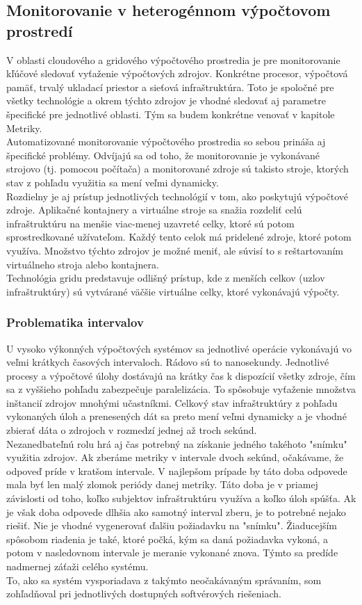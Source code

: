 \documentclass[printed,11pt,twoside,color,cover,table]{fithesis3}
\begin{document}
\subsection{Monitorovanie v heterogénnom výpočtovom prostredí}
V oblasti cloudového a gridového výpočtového prostredia je pre monitorovanie kľúčové sledovať vyťaženie výpočtových zdrojov. Konkrétne procesor, výpočtová pamäť, trvalý ukladací priestor a sieťová infraštruktúra. Toto je spoločné
pre všetky technológie a okrem týchto zdrojov je vhodné sledovať aj parametre špecifické pre jednotlivé oblasti. Tým sa budem konkrétne venovať v kapitole Metriky.
\\Automatizované monitorovanie výpočtového prostredia so sebou prináša aj špecifické problémy. Odvíjajú sa od toho, že monitorovanie je vykonávané strojovo (tj. pomocou počítača) a monitorované zdroje sú takisto stroje, ktorých
stav z pohľadu využitia sa mení veľmi dynamicky.
\\Rozdielny je aj prístup jednotlivých technológií v tom, ako poskytujú výpočtové zdroje. Aplikačné kontajnery a virtuálne stroje sa snažia rozdeliť celú infraštruktúru na menšie viac-menej uzavreté celky, 
ktoré sú potom sprostredkované užívateľom. Každý tento celok má pridelené zdroje, ktoré potom využíva. Množstvo týchto zdrojov je možné meniť, ale súvisí to s reštartovaním virtuálneho stroja alebo kontajnera.
\\Technológia gridu predstavuje odlišný prístup, kde z menších celkov (uzlov infraštruktúry) sú vytvárané väčšie virtuálne celky, ktoré vykonávajú výpočty.

\subsubsection{Problematika intervalov}
U vysoko výkonných výpočtových systémov sa jednotlivé operácie vykonávajú vo veľmi krátkych časových intervaloch. Rádovo sú to nanosekundy. Jednotlivé procesy a výpočtové úlohy dostávajú na krátky čas k dispozícií všetky zdroje, čím 
sa z vyššieho pohľadu zabezpečuje paralelizácia. To spôsobuje vyťaženie množstva inštancií zdrojov mnohými učastníkmi. Celkový stav infraštruktúry z pohľadu vykonaných úloh a prenesených dát sa preto mení veľmi dynamicky a je vhodné
zbierať dáta o zdrojoch v rozmedzí jednej až troch sekúnd. 
\\Nezanedbateľnú rolu hrá aj čas potrebný na získanie jedného takéhoto "snímku" využitia zdrojov. Ak zberáme metriky v intervale dvoch sekúnd, očakávame, že odpoveď príde v kratšom intervale. 
V najlepšom prípade by táto doba odpovede mala byť len malý zlomok periódy danej metriky. Táto doba je v priamej závislosti od toho, koľko subjektov infraštruktúru využíva a koľko úloh spúšťa. 
Ak je však doba odpovede dlhšia ako samotný interval zberu, je to potrebné nejako riešiť. Nie je vhodné vygenerovať ďalšiu požiadavku na "snímku". Žiaducejším spôsobom riadenia je také, ktoré počká, kým sa daná požiadavka vykoná, a potom v nasledovnom intervale je meranie vykonané znova. Týmto sa predíde nadmernej záťaži
celého systému.
\\To, ako sa systém vysporiadava z takýmto neočakávaným správaním, som zohľadňoval pri jednotlivých dostupných softvérových riešeniach.
\end{document}
